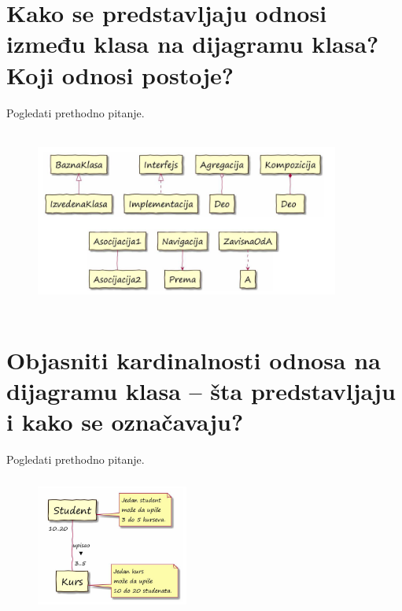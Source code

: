\documentclass[a4paper]{article}
\begin{document}
\section{Kako se predstavljaju odnosi između klasa na dijagramu klasa? Koji odnosi postoje?}
  Pogledati prethodno pitanje.
  \begin{figure}[H]
    \begin{center}
        \includegraphics[width=100mm,height=60mm]{Slike/odnosi.png}
    \end{center}
  \end{figure} 

\newpage

\section{Objasniti kardinalnosti odnosa na dijagramu klasa – šta predstavljaju i kako se označavaju?}
  Pogledati prethodno pitanje.
  \begin{figure}[H]
    \begin{center}
        \includegraphics[width=50mm,height=45mm]{Slike/kardinalnost.png}
    \end{center}
  \end{figure} 
\end{document}
